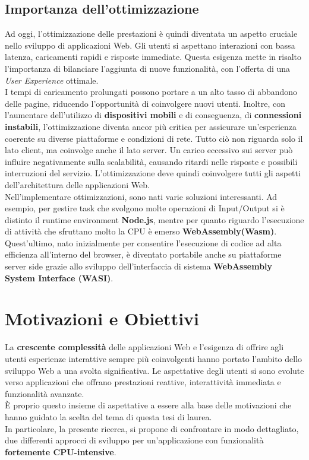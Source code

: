 \subsection{Importanza dell'ottimizzazione}
Ad oggi, l'ottimizzazione delle prestazioni è quindi diventata un aspetto cruciale nello sviluppo di applicazioni Web.
Gli utenti si aspettano interazioni con bassa latenza, caricamenti rapidi e risposte immediate.
Questa esigenza mette in risalto l'importanza di bilanciare l'aggiunta di nuove funzionalità, con l'offerta di una \emph{User Experience} ottimale.
\\I tempi di caricamento prolungati possono portare a un alto tasso di abbandono delle pagine, riducendo l'opportunità di coinvolgere nuovi utenti.
Inoltre, con l'aumentare dell'utilizzo di \textbf{dispositivi mobili} e di conseguenza, di \textbf{connessioni instabili}, l'ottimizzazione diventa ancor più critica per assicurare un'esperienza coerente su diverse piattaforme e condizioni di rete.
Tutto ciò non riguarda solo il lato client, ma coinvolge anche il lato server. 
Un carico eccessivo sui server può influire negativamente sulla scalabilità, causando ritardi nelle risposte e possibili interruzioni del servizio.
L'ottimizzazione deve quindi coinvolgere tutti gli aspetti dell'architettura delle applicazioni Web.
\\Nell'implementare ottimizzazioni, sono nati varie soluzioni interessanti. 
Ad esempio, per gestire task che svolgono molte operazioni di Input/Output si è distinto il runtime environment \textbf{Node.js}\cite*{nodeHome}, mentre per quanto riguardo l'esecuzione di attività che sfruttano molto la CPU è emerso \textbf{WebAssembly(Wasm)}\cite*{wasmHome}.
Quest'ultimo, nato inizialmente per consentire l'esecuzione di codice ad alta efficienza all'interno del browser, è diventato portabile anche su piattaforme server side grazie allo sviluppo dell'interfaccia di sistema \textbf{WebAssembly System Interface (WASI)}\cite*{wasiHome}.


\section{Motivazioni e Obiettivi}
\label{sec:Obiettivi}
La \textbf{crescente complessità} delle applicazioni Web e l'esigenza di offrire agli utenti esperienze interattive sempre più coinvolgenti hanno portato l'ambito dello sviluppo Web a una svolta significativa.
Le aspettative degli utenti si sono evolute verso applicazioni che offrano prestazioni reattive, interattività immediata e funzionalità avanzate.
\\È proprio questo insieme di aspettative a essere alla base delle motivazioni che hanno guidato la scelta del tema di questa tesi di laurea.
\\In particolare, la presente ricerca, si propone di confrontare in modo dettagliato, due differenti approcci di sviluppo per un'applicazione con funzionalità \textbf{fortemente CPU-intensive}.
